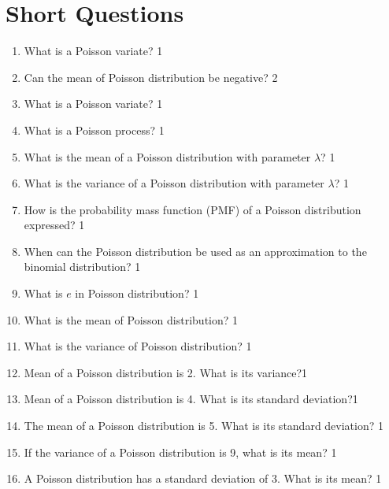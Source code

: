 \documentclass[a4paper,oneside, margin=1.4in]{book}
\begin{document}
\section{Short Questions}

\begin{enumerate}

    \item
	What is a Poisson variate? \hfill 1
    \item
	Can the mean of Poisson distribution be negative? \hfill 2

  \item What is a Poisson variate? \hfill 1
  
  \item What is a Poisson process?  \hfill 1
  
  \item What is the mean of a Poisson distribution with parameter \( \lambda \)? \hfill 1

\item What is the variance of a Poisson distribution with parameter \( \lambda \)? \hfill 1

\item How is the probability mass function (PMF) of a Poisson distribution expressed? \hfill 1

\item When can the Poisson distribution be used as an approximation to the binomial distribution? \hfill 1

\item What is $e$ in Poisson distribution? \hfill 1

\item What is the mean of Poisson distribution? \hfill 1

\item What is the variance of Poisson distribution? \hfill 1

\item Mean of a Poisson distribution is 2. What is its variance?\hfill 1

\item Mean of a Poisson distribution is 4. What is its standard deviation?\hfill 1

\item The mean of a Poisson distribution is 5. What is its standard deviation? \hfill 1

\item If the variance of a Poisson distribution is 9, what is its mean? \hfill 1

\item A Poisson distribution has a standard deviation of 3. What is its mean? \hfill 1


\end{enumerate}
\end{document}
